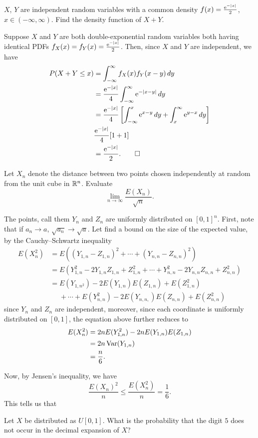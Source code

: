\begin{problem}
  \(X\), \(Y\) are independent random variables with a common density
  \(f(x)=\frac{\mathrm{e}^{-|x|}}{2}\), \(x\in(-\infty,\infty)\). Find the
  density function of \(X+Y\).
\end{problem}
\begin{solution*}
  Suppose \(X\) and \(Y\) are both double-exponential random variables both
  having identical PDFs \(f_X(x)=f_Y(x)=\frac{\mathrm{e}^{-|x|}}{2}\). Then,
  since \(X\) and \(Y\) are independent, we have
  \begin{align*}
    P(X+Y\leq x)
    &=\int_{-\infty}^\infty f_X(x)f_Y(x-y)\mathop{}\!d y\\
    &=\frac{\mathrm{e}^{-|x|}}{4}\int_{-\infty}^\infty\mathrm{e}^{-|x-y|}\mathop{}\!d y\\
    &=\frac{\mathrm{e}^{-|x|}}{4}
      \left[
      \int_{-\infty}^x\mathrm{e}^{x-y}\mathop{}\!d y
      +\int_x^\infty\mathrm{e}^{y-x}\mathop{}\!d y
      \right]\\
    &\frac{\mathrm{e}^{-|x|}}{4}[1+1]\\
    &=\frac{\mathrm{e}^{-|x|}}{2}.\qedhere
  \end{align*}
\end{solution*}

\begin{problem}
  Let \(X_n\) denote the distance between two points chosen independently
  at random from the unit cube in \(\mathbb{R}^n\). Evaluate
  \[
    \lim_{n\to\infty}\frac{E(X_n)}{\sqrt{n}}.
  \]
\end{problem}
\begin{solution*}
  The points, call them \(Y_n\) and \(Z_n\) are uniformly distributed on
  \([0,1]^n\). First, note that if \(a_n\to a\), \(\sqrt{a_n}\to\sqrt{a}\).
  Let find a bound on the size of the expected value, by the
  Cauchy--Schwartz inequality
  \begin{align*}
    E(X_n^2)
    &=E\left((Y_{1,n}-Z_{1,n})^2+\dotsb+(Y_{n,n}-Z_{n,n})^2\right)\\
    &=E\left(Y_{1,n}^2-2Y_{1,n}Z_{1,n}+Z_{1,n}^2
      +\dotsb+
      Y_{n,n}^2-2Y_{n,n}Z_{n,n}+Z_{n,n}^2
      \right)\\
    &=E(Y_{1,n^2})-2E(Y_{1,n})E(Z_{1,n})+E(Z_{1,n}^2)\\
    &\phantom{{}={}}+\dotsb+E(Y_{n,n}^2)-2E(Y_{n,n,})E(Z_{n,n})+E(Z_{n,n}^2)
  \end{align*}
  since \(Y_n\) and \(Z_n\) are independent, moreover, since each
  coordinate is uniformly distributed on \([0,1]\), the equation above
  further reduces to
  \begin{align*}
    E(X_n^2)
    &=2nE(Y_{1,n}^2)-2nE(Y_{1,n})E(Z_{1,n})\\
    &=2n\operatorname{Var}(Y_{1,n})\\
    &=\frac{n}{6}.
  \end{align*}

  Now, by Jensen's inequality, we have
  \[
    \frac{E(X_n)^2}{n}\leq \frac{E(X_n^2)}{n}=\frac{1}{6}.
  \]
  This tells us that
\end{solution*}

\begin{problem}
  Let \(X\) be distributed as \(U[0,1]\). What is the probability that the
  digit \(5\) does not occur in the decimal expansion of \(X\)?
\end{problem}
\begin{solution*}

\end{solution*}

